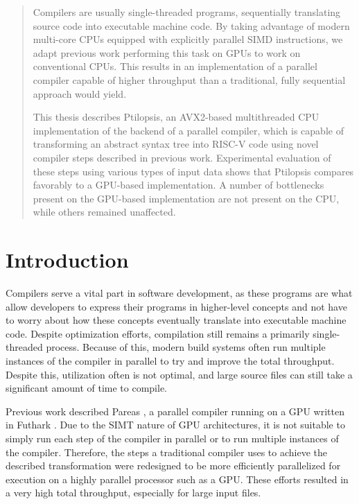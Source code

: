 \documentclass[11pt,dvipsnames]{article}
\begin{document}


\begin{abstract}

\noindent
Compilers are usually single-threaded programs, sequentially translating source code into executable machine code. By taking advantage of modern multi-core CPUs equipped with explicitly parallel SIMD instructions, we adapt previous work performing this task on GPUs to work on conventional CPUs. This results in an implementation of a parallel compiler capable of higher throughput than a traditional, fully sequential approach would yield.

This thesis describes Ptilopsis, an AVX2-based multithreaded CPU implementation of the backend of a parallel compiler, which is capable of transforming an abstract syntax tree into RISC-V code using novel compiler steps described in previous work. Experimental evaluation of these steps using various types of input data shows that Ptilopsis compares favorably to a GPU-based implementation. A number of bottlenecks present on the GPU-based implementation are not present on the CPU, while others remained unaffected.

\end{abstract}

\thispagestyle{empty}
\tableofcontents
\thispagestyle{empty}

\clearpage
\setcounter{page}{1}

\section{Introduction} \label{introduction}
Compilers serve a vital part in software development, as these programs are what allow developers to express their programs in higher-level concepts and not have to worry about how these concepts eventually translate into executable machine code. Despite optimization efforts, compilation still remains a primarily single-threaded process. Because of this, modern build systems often run multiple instances of the compiler in parallel to try and improve the total throughput. Despite this, utilization often is not optimal, and large source files can still take a significant amount of time to compile.

Previous work described Pareas \cite{voetter2021} \cite{huijben2021} \cite{pareas22}, a parallel compiler running on a GPU written in Futhark \cite{futhark}. Due to the SIMT nature of GPU architectures, it is not suitable to simply run each step of the compiler in parallel or to run multiple instances of the compiler. Therefore, the steps a traditional compiler uses to achieve the described transformation were redesigned to be more efficiently parallelized for execution on a highly parallel processor such as a GPU. These efforts resulted in a very high total throughput, especially for large input files.
\end{document}

